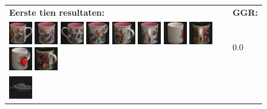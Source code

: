 \begin{figure}[tbp]
\begin{center}
\begin{tabular}{m{11cm} | m{3cm} |}
\textbf{Eerste tien resultaten:} & \textbf{GGR:} \\
\vspace{4pt}
\includegraphics[width=1cm]{coil/beeld-6.eps}
\includegraphics[width=1cm]{coil/beeld-8.eps}
\includegraphics[width=1cm]{coil/beeld-7.eps}
\includegraphics[width=1cm]{coil/beeld-9.eps}
\includegraphics[width=1cm]{coil/beeld-10.eps}
\includegraphics[width=1cm]{coil/beeld-11.eps}
\includegraphics[width=1cm]{coil/beeld-38.eps}
\includegraphics[width=1cm]{coil/beeld-65.eps}
\includegraphics[width=1cm]{coil/beeld-39.eps}
\includegraphics[width=1cm]{coil/beeld-64.eps}
& {\scriptsize 0.0}
\\
\includegraphics[width=1cm]{coil/beeld-24.eps}

\end{tabular}
\end{center}
\end{figure}
